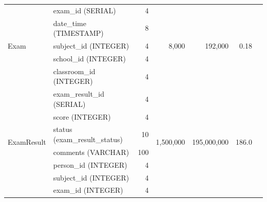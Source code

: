 \documentclass[a4paper]{article}
\begin{document}
\begin{longtable}{|l|p{2cm}|r|r|r|r|r|}
      \multirow{5}{*}{Exam}
                        & exam\_id (SERIAL)              & 4                     & \multirow{5}{*}{8,000}     & \multirow{5}{*}{192,000}      & \multirow{5}{*}{0.18}    \\
                        & date\_time (TIMESTAMP)         & 8                     &                            &                               &                          \\
                        & subject\_id (INTEGER)          & 4                     &                            &                               &                          \\
                        & school\_id (INTEGER)           & 4                     &                            &                               &                          \\
                        & classroom\_id (INTEGER)        & 4                     &                            &                               &                          \\ \hline

      \multirow{7}{*}{ExamResult}
                        & exam\_result\_id (SERIAL)      & 4                     & \multirow{7}{*}{1,500,000} & \multirow{7}{*}{195,000,000}  & \multirow{7}{*}{186.0}   \\
                        & score (INTEGER)                & 4                     &                            &                               &                          \\
                        & status (exam\_result\_status)  & 10                    &                            &                               &                          \\
                        & comments (VARCHAR)             & 100                   &                            &                               &                          \\
                        & person\_id (INTEGER)           & 4                     &                            &                               &                          \\
                        & subject\_id (INTEGER)          & 4                     &                            &                               &                          \\
                        & exam\_id (INTEGER)             & 4                     &                            &                               &                          \\ \hline


\end{longtable}
\end{document}
